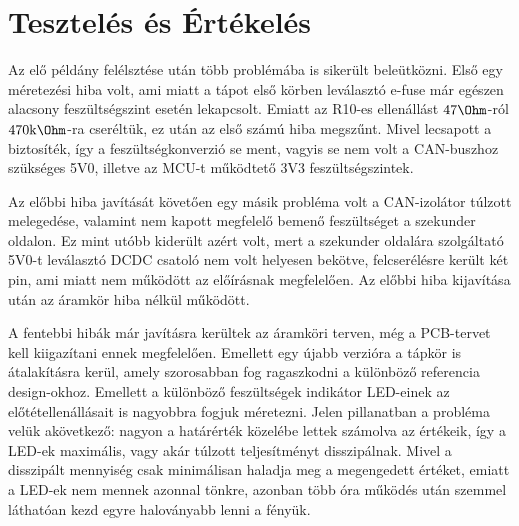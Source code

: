 \pagebreak
\section{Tesztelés és Értékelés}

Az elő példány felélsztése után több problémába is sikerült beleütközni. Első egy méretezési hiba volt, ami miatt a tápot első körben leválasztó e-fuse már egészen alacsony feszültségszint esetén lekapcsolt. Emiatt az R10-es ellenállást $47\si{\Ohm}$-ról $470\si{\kilo\Ohm}$-ra cseréltük, ez után az első számú hiba megszűnt. Mivel lecsapott a biztosíték, így a feszültségkonverzió se ment, vagyis se nem volt a CAN-buszhoz szükséges 5V0, illetve az MCU-t működtető 3V3 feszültségszintek.

Az előbbi hiba javítását követően egy másik probléma volt a CAN-izolátor túlzott melegedése, valamint nem kapott megfelelő bemenő feszültséget a szekunder oldalon. Ez mint utóbb kiderült azért volt, mert a szekunder oldalára szolgáltató 5V0-t leválasztó DCDC csatoló nem volt helyesen bekötve, felcserélésre került két pin, ami miatt nem működött az előírásnak megfelelően.  Az előbbi hiba kijavítása után az áramkör hiba nélkül működött.

A fentebbi hibák már javításra kerültek az áramköri terven, még a PCB-tervet kell kiigazítani ennek megfelelően. Emellett egy újabb verzióra a tápkör is átalakításra kerül, amely szorosabban fog ragaszkodni a különböző referencia design-okhoz. Emellett a különböző feszültségek indikátor LED-einek az előtétellenállásait is nagyobbra fogjuk méretezni. Jelen pillanatban a probléma velük akövetkező: nagyon a határérték közelébe lettek számolva az értékeik, így a LED-ek maximális, vagy akár túlzott teljesítményt disszipálnak. Mivel a disszipált mennyiség csak minimálisan haladja meg a megengedett értéket, emiatt a LED-ek nem mennek azonnal tönkre, azonban több óra működés után szemmel láthatóan kezd egyre haloványabb lenni a fényük.
